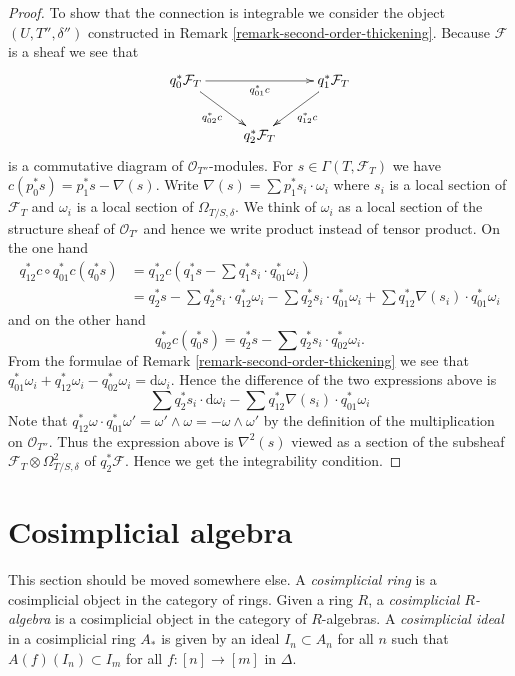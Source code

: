 \documentclass{stacks-project}
\theoremstyle{plain}
\theoremstyle{definition}
\theoremstyle{remark}
\numberwithin{equation}{subsection}
\begin{document}
\begin{proof}
\medskip\noindent
To show that the connection is integrable we consider the
object $(U, T'', \delta'')$ constructed in
Remark \ref{remark-second-order-thickening}.
Because $\mathcal{F}$ is a sheaf we see that
$$
\xymatrix{
q_0^*\mathcal{F}_T \ar[rr]_{q_{01}^*c} \ar[rd]_{q_{02}^*c} & &
q_1^*\mathcal{F}_T \ar[ld]^{q_{12}^*c} \\
& q_2^*\mathcal{F}_T
}
$$
is a commutative diagram of $\mathcal{O}_{T''}$-modules. For
$s \in \Gamma(T, \mathcal{F}_T)$ we have
$c(p_0^*s) = p_1^*s - \nabla(s)$. Write
$\nabla(s) = \sum p_1^*s_i \cdot \omega_i$ where $s_i$ is a local section
of $\mathcal{F}_T$ and $\omega_i$ is a local section of $\Omega_{T/S, \delta}$.
We think of $\omega_i$ as a local section of the structure
sheaf of $\mathcal{O}_{T'}$ and hence we write product instead of tensor
product. On the one hand
\begin{align*}
q_{12}^*c \circ q_{01}^*c(q_0^*s) & = 
q_{12}^*c(q_1^*s - \sum q_1^*s_i \cdot q_{01}^*\omega_i) \\
& =
q_2^*s - \sum q_2^*s_i \cdot q_{12}^*\omega_i -
\sum q_2^*s_i \cdot q_{01}^*\omega_i +
\sum q_{12}^*\nabla(s_i) \cdot q_{01}^*\omega_i
\end{align*}
and on the other hand
$$
q_{02}^*c(q_0^*s) = q_2^*s - \sum q_2^*s_i \cdot q_{02}^*\omega_i.
$$
From the formulae of Remark \ref{remark-second-order-thickening} we see
that
$q_{01}^*\omega_i + q_{12}^*\omega_i - q_{02}^*\omega_i = \text{d}\omega_i$.
Hence the difference of the two expressions above is
$$
\sum q_2^*s_i \cdot \text{d}\omega_i -
\sum q_{12}^*\nabla(s_i) \cdot q_{01}^*\omega_i
$$
Note that
$q_{12}^*\omega \cdot q_{01}^*\omega' = \omega' \wedge \omega =
- \omega \wedge \omega'$ by the definition of the multiplication on
$\mathcal{O}_{T''}$. Thus the expression above is $\nabla^2(s)$ viewed
as a section of the subsheaf $\mathcal{F}_T \otimes \Omega^2_{T/S, \delta}$ of
$q_2^*\mathcal{F}$. Hence we get the integrability condition.
\end{proof}




\section{Cosimplicial algebra}
\label{section-cosimplicial}

\noindent
This section should be moved somewhere else. A
{\it cosimplicial ring} is a cosimplicial object
in the category of rings. Given a ring $R$, a
{\it cosimplicial $R$-algebra} is a cosimplicial object in the
category of $R$-algebras. A {\it cosimplicial ideal} in a cosimplicial
ring $A_*$ is given by an ideal $I_n \subset A_n$ for all $n$ such
that $A(f)(I_n) \subset I_m$ for all $f : [n] \to [m]$ in $\Delta$.
\end{document}

